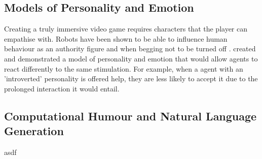 \documentclass[conference]{IEEEtran}
\begin{document}
\subsection{Models of Personality and Emotion}

Creating a truly immersive video game requires characters that the player can empathise with. Robots have been shown to be able to influence human behaviour as an authority figure \cite{bossrobot} and when begging not to be turned off \cite{turnoffrobot}. \cite{personalitymodel} created and demonstrated a model of personality and emotion that would allow agents to react differently to the same stimulation. For example, when a agent with an 'introverted' personality is offered help, they are less likely to accept it due to the prolonged interaction it would entail. 

\cite{skyrim}

\subsection{Computational Humour and Natural Language Generation}

\begin{thebibliography}{00}
		\bibitem asdf
\end{thebibliography}
\vspace{12pt}
\end{document}

